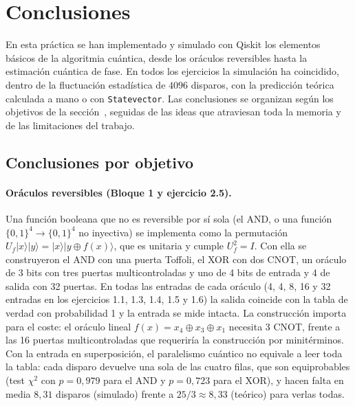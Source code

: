 \section{Conclusiones}\label{sec:conclusiones}

En esta práctica se han implementado y simulado con Qiskit los elementos básicos de la algoritmia cuántica, desde los oráculos reversibles hasta la estimación cuántica de fase.
En todos los ejercicios la simulación ha coincidido, dentro de la fluctuación estadística de $4096$ disparos, con la predicción teórica calculada a mano o con \texttt{Statevector}.
Las conclusiones se organizan según los objetivos de la sección~, seguidas de las ideas que atraviesan toda la memoria y de las limitaciones del trabajo.

\subsection{Conclusiones por objetivo}

\paragraph{Oráculos reversibles (Bloque 1 y ejercicio 2.5).} Una función booleana que no es reversible por sí sola (el AND, o una función $\{0,1\}^4\to\{0,1\}^4$ no inyectiva)
se implementa como la permutación $U_f|x\rangle|y\rangle=|x\rangle|y\oplus f(x)\rangle$, que es unitaria y cumple $U_f^2=I$. Con ella se construyeron el AND con una puerta Toffoli,
el XOR con dos CNOT, un oráculo de 3 bits con tres puertas multicontroladas y uno de 4 bits de entrada y 4 de salida con 32 puertas. En todas las entradas de cada oráculo
(4, 4, 8, 16 y 32 entradas en los ejercicios 1.1, 1.3, 1.4, 1.5 y 1.6) la salida coincide con la tabla de verdad con probabilidad 1 y la entrada se mide intacta.
La construcción importa para el coste: el oráculo lineal $f(x)=x_4\oplus x_3\oplus x_1$ necesita 3 CNOT, frente a las 16 puertas multicontroladas que requeriría la construcción por minitérminos.
Con la entrada en superposición, el paralelismo cuántico no equivale a leer toda la tabla: cada disparo devuelve una sola de las cuatro filas, que son equiprobables
(test $\chi^2$ con $p=0{,}979$ para el AND y $p=0{,}723$ para el XOR), y hacen falta en media $8{,}31$ disparos (simulado) frente a $25/3\approx8{,}33$ (teórico) para verlas todas.

